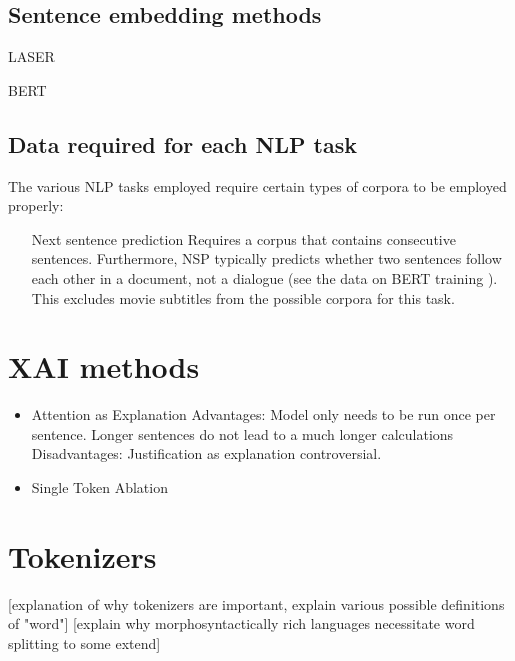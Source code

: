 \subsection{Sentence embedding methods}

\begin{description}
	\item[LASER] \cite{artetxeMassivelyMultilingualSentence2019}
	\item[BERT] \cite{reimersMakingMonolingualSentence2020}
\end{description}

\subsection{Data required for each NLP task}
The various NLP tasks employed require certain types of corpora to be employed properly:

\begin{itemize}
	\item[Next sentence prediction]
	      Requires a corpus that contains consecutive sentences.
	      Furthermore, NSP typically predicts whether two sentences follow each other in a document, not a dialogue (see the data on BERT training \cite{kentonBertPretrainingDeep2019}).
	      This excludes movie subtitles from the possible corpora for this task.

\end{itemize}

\section{XAI methods}
\begin{itemize}
	\item Attention as Explanation
	      Advantages:
	      Model only needs to be run once per sentence.
	      Longer sentences do not lead to a much longer calculations
	      Disadvantages: Justification as explanation controversial.
	\item Single Token Ablation
\end{itemize}

\section{Tokenizers}
[explanation of why tokenizers are important, explain various possible definitions of "word"]
[explain why morphosyntactically rich languages necessitate word splitting to some extend]

